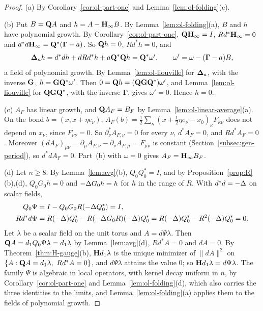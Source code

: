 \begin{proof}
(a) By Corollary~\ref{cor:ol-part-one} and Lemma~\ref{lem:ol-folding}(c).

(b) Put $B=\mathbf Q A$ and $h=A-\mathbf H_\infty B$. By Lemma~\ref{lem:ol-folding}(a), $B$ and $h$ have polynomial growth. By Corollary~\ref{cor:ol-part-one}, $\mathbf Q\mathbf H_\infty=I$, $Rd^*\mathbf H_\infty=0$ and $d^*d\mathbf H_\infty=\mathbf Q^*(\boldsymbol\Gamma-a)$. So $\mathbf Q h=0$, $Rd^*h=0$, and
\[
\boldsymbol{\Delta}_ah=d^*dh+dRd^*h+a\mathbf Q^*\mathbf Q h=\mathbf Q^*\omega',\qquad\omega'=\omega-(\boldsymbol\Gamma-a)B,
\]
a field of polynomial growth. By Lemma~\ref{lem:ol-liouville} for $\boldsymbol{\Delta}_a$, with the inverse $\mathbf G$, $h=\mathbf G\mathbf Q^*\omega'$. Then $0=\mathbf Q h=(\mathbf Q\mathbf G\mathbf Q^*)\omega'$, and Lemma~\ref{lem:ol-liouville} for $\mathbf Q\mathbf G\mathbf Q^*$, with the inverse $\boldsymbol\Gamma$, gives $\omega'=0$. Hence $h=0$.

(c) $A_F$ has linear growth, and $\mathbf Q A_F=B_F$ by Lemma~\ref{lem:ol-linear-average}(a). On the bond $b=(x,x+\eta e_\nu)$, $A_F(b)=\frac12\sum_\kappa(x+\frac12\eta e_\nu-x_0)_\kappa F_{\kappa\nu}$ does not depend on $x_\nu$, since $F_{\nu\nu}=0$. So $\partial_\nu^*A_{F,\nu}=0$ for every $\nu$, $d^*A_F=0$, and $Rd^*A_F=0$. Moreover $(dA_F)_{\mu\nu}=\partial_\mu A_{F,\nu}-\partial_\nu A_{F,\mu}=F_{\mu\nu}$ is constant (Section~\ref{subsec:gen-period}), so $d^*dA_F=0$. Part~(b) with $\omega=0$ gives $A_F=\mathbf H_\infty B_F$.

(d) Let $n\ge8$. By Lemma~\ref{lem:avg}(b), $Q_0Q_0^*=I$, and by Proposition~\ref{prop:R}(b),(d), $Q_0G_0h=0$ and $-\Delta G_0h=h$ for $h$ in the range of $R$. With $d^*d=-\Delta$ on scalar fields,
\[
\begin{aligned}
Q_0\Psi&=I-Q_0G_0R(-\Delta Q_0^*)=I,\\
Rd^*d\Psi&=R(-\Delta)Q_0^*-R(-\Delta G_0R)(-\Delta)Q_0^*=R(-\Delta)Q_0^*-R^2(-\Delta)Q_0^*=0 .
\end{aligned}
\]
Let $\lambda$ be a scalar field on the unit torus and $A=d\Psi\lambda$. Then $\mathbf Q A=d_1 Q_0\Psi\lambda=d_1\lambda$ by Lemma~\ref{lem:avg}(d), $Rd^*A=0$ and $dA=0$. By Theorem~\ref{thm:H-gauge}(b), $\mathbf Hd_1\lambda$ is the unique minimizer of $\|dA\|^2$ on $\{A:\mathbf Q A=d_1\lambda,\ Rd^*A=0\}$, and $d\Psi\lambda$ attains the value $0$; so $\mathbf Hd_1\lambda=d\Psi\lambda$. The family $\Psi$ is algebraic in local operators, with kernel decay uniform in $n$, by Corollary~\ref{cor:ol-part-one} and Lemma~\ref{lem:ol-folding}(d), which also carries the three identities to the limits, and Lemma~\ref{lem:ol-folding}(a) applies them to the fields of polynomial growth.


\end{proof}
